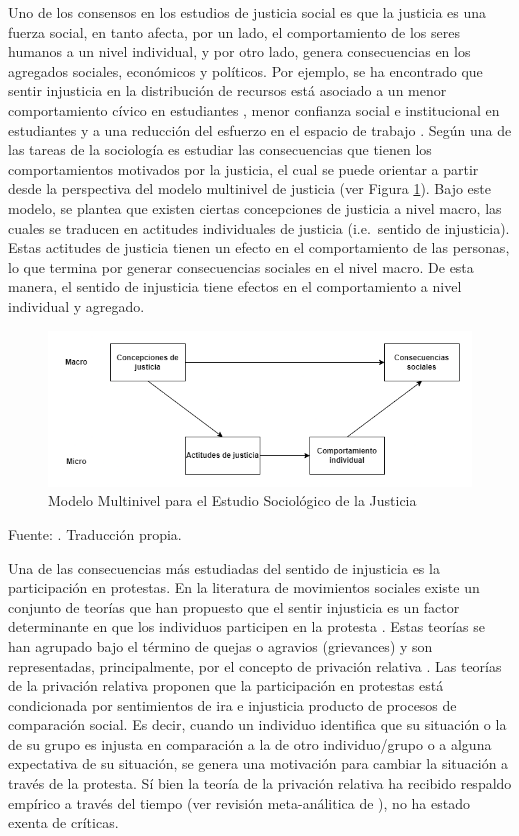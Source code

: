 \documentclass[12pt,twoside]{templates/facsothesis}
\begin{document}
Uno de los consensos en los estudios de justicia social es que la justicia es una fuerza social, en tanto afecta, por un lado, el comportamiento de los seres humanos a un nivel individual, y por otro lado, genera consecuencias en los agregados sociales, económicos y políticos. Por ejemplo, se ha encontrado que sentir injusticia en la distribución de recursos está asociado a un menor comportamiento cívico en estudiantes \citep{Resh2017}, menor confianza social e institucional en estudiantes \citep{Sabbagh2018} y a una reducción del esfuerzo en el espacio de trabajo \citep{Adriaans2017}. Según \citet{Liebig2016} una de las tareas de la sociología es estudiar las consecuencias que tienen los comportamientos motivados por la justicia, el cual se puede orientar a partir desde la perspectiva del modelo multinivel de justicia (ver Figura \ref{fig:multilevel}). Bajo este modelo, se plantea que existen ciertas concepciones de justicia a nivel macro, las cuales se traducen en actitudes individuales de justicia (i.e.~sentido de injusticia). Estas actitudes de justicia tienen un efecto en el comportamiento de las personas, lo que termina por generar consecuencias sociales en el nivel macro. De esta manera, el sentido de injusticia tiene efectos en el comportamiento a nivel individual y agregado.

\begin{figure}[!ht]
\includegraphics[width=0.75\linewidth,]{images/multilevel} \caption{Modelo Multinivel para el Estudio Sociológico de la Justicia}\label{fig:multilevel}
\end{figure}

Fuente: \citet{Liebig2016}. Traducción propia.

Una de las consecuencias más estudiadas del sentido de injusticia es la participación en protestas. En la literatura de movimientos sociales existe un conjunto de teorías que han propuesto que el sentir injusticia es un factor determinante en que los individuos participen en la protesta \citep{Runciman1966, Gurr1970, BarringtonMoore1978}. Estas teorías se han agrupado bajo el término de quejas o agravios (grievances) y son representadas, principalmente, por el concepto de privación relativa \citep{Runciman1966, Gurr1970}. Las teorías de la privación relativa proponen que la participación en protestas está condicionada por sentimientos de ira e injusticia producto de procesos de comparación social. Es decir, cuando un individuo identifica que su situación o la de su grupo es injusta en comparación a la de otro individuo/grupo o a alguna expectativa de su situación, se genera una motivación para cambiar la situación a través de la protesta. Sí bien la teoría de la privación relativa ha recibido respaldo empírico a través del tiempo (ver revisión meta-análitica de \citet{Smith2012}), no ha estado exenta de críticas.
\end{document}
